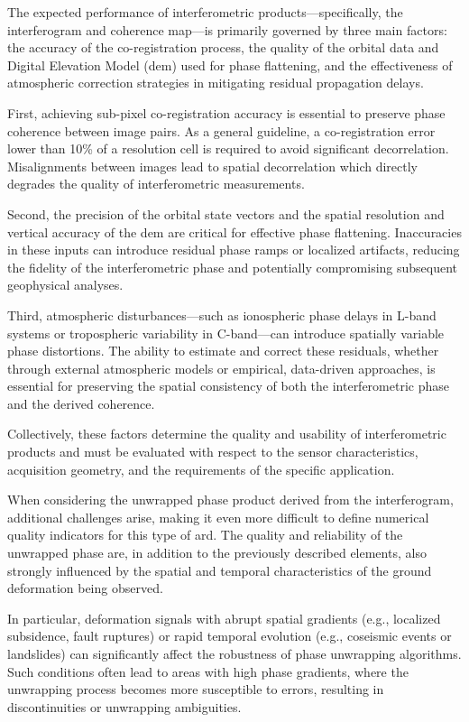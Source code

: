 The expected performance of interferometric products—specifically, the interferogram and coherence map—is primarily governed by three main factors: the accuracy of the co-registration process, the quality of the orbital data and Digital Elevation Model (\acs{dem}) used for phase flattening, and the effectiveness of atmospheric correction strategies in mitigating residual propagation delays.

First, achieving sub-pixel co-registration accuracy is essential to preserve phase coherence between image pairs. As a general guideline, a co-registration error lower than 10\% of a resolution cell is required to avoid significant decorrelation. Misalignments between images lead to spatial decorrelation which directly degrades the quality of interferometric measurements.

Second, the precision of the orbital state vectors and the spatial resolution and vertical accuracy of the \acs{dem} are critical for effective phase flattening. Inaccuracies in these inputs can introduce residual phase ramps or localized artifacts, reducing the fidelity of the interferometric phase and potentially compromising subsequent geophysical analyses.

Third, atmospheric disturbances—such as ionospheric phase delays in L-band systems or tropospheric variability in C-band—can introduce spatially variable phase distortions. The ability to estimate and correct these residuals, whether through external atmospheric models or empirical, data-driven approaches, is essential for preserving the spatial consistency of both the interferometric phase and the derived coherence.

Collectively, these factors determine the quality and usability of interferometric products and must be evaluated with respect to the sensor characteristics, acquisition geometry, and the requirements of the specific application.

When considering the unwrapped phase product derived from the interferogram, additional challenges arise, making it even more difficult to define numerical quality indicators for this type of \acs{ard}. The quality and reliability of the unwrapped phase are, in addition to the previously described elements, also strongly influenced by the spatial and temporal characteristics of the ground deformation being observed.

In particular, deformation signals with abrupt spatial gradients (e.g., localized subsidence, fault ruptures) or rapid temporal evolution (e.g., coseismic events or landslides) can significantly affect the robustness of phase unwrapping algorithms. Such conditions often lead to areas with high phase gradients, where the unwrapping process becomes more susceptible to errors, resulting in  discontinuities or unwrapping ambiguities.

